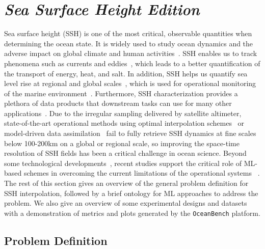 \section{\textit{Sea Surface Height Edition}}\label{sec:interp_challenge}

Sea surface height (SSH) is one of the most critical, observable quantities when determining the ocean state. 
It is widely used to study ocean dynamics and the adverse impact on global climate and human activities~\cite{SSHMESOSCALE}. 
SSH enables us to track phenomena such as currents and eddies~\cite{SSHMESOSCALE,SSHMESOSCALE2,SSHMESOSCALE3}, which leads to a better quantification of the transport of energy, heat, and salt. 
In addition, SSH helps us quantify sea level rise at regional and global scales~\cite{SSHSEALEVEL,OCEANSEALEVEL}, which is used for operational monitoring of the marine environment~\cite{SSHOPERATIONAL}. 
Furthermore, SSH characterization provides a plethora of data products that downstream tasks can use for many other applications~\cite{SSH3DCIRCULATION, 3DQGOC}.
%
Due to the irregular sampling delivered by satellite altimeter, state-of-the-art operational methods using optimal interpolation schemes~\cite{DUACS, MIOST} or model-driven data assimilation~\cite{DINEOF, DINEOF2, ANALOGDA, ANALOGDA2} fail to fully retrieve SSH dynamics at fine scales below 100-200km on a global or regional scale, so improving the space-time resolution of SSH fields has been a critical challenge in ocean science. 
Beyond some technological developments~\cite{SWOT}, recent studies support the critical role of ML-based schemes in overcoming the current limitations of the operational systems~\cite{4DVARNETSWOT, BFNQG, SSHInterpAttention} .  
%
The rest of this section gives an overview of the general problem definition for SSH interpolation, followed by a brief ontology for ML approaches to address the problem. 
We also give an overview of some experimental designs and datasets with a demonstration of metrics and plots generated by the \texttt{OceanBench} platform. 



\subsection{Problem Definition}\label{sec:prob_definition}

